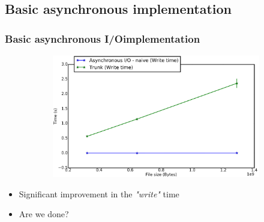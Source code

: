 \documentclass[slidestop,xcolor=dvipsnames, notes=hide]{beamer}
\newcommand{\notationIO}					{I/O}
\newcommand{\notationaio}					{asynchronous \notationIO}
\begin{document}
	\subsection{Basic asynchronous implementation}
		\begin{frame}
			\frametitle{Basic \notationaio\space implementation}
			\begin{figure}[!h]
				\centering
				\begin{subfigure}[b]{0.7\textwidth}
					\centering
					\includegraphics[width=\textwidth]{images/cubeRemapper_basicImplementation_write_hpc.png}
				\end{subfigure}
			\end{figure}

			\begin{block}{}
			\begin{itemize}
				\item Significant improvement in the \emph{"write"} time
				\item Are we done?
			\end{itemize}
			\end{block}
		\end{frame}
\end{document}
